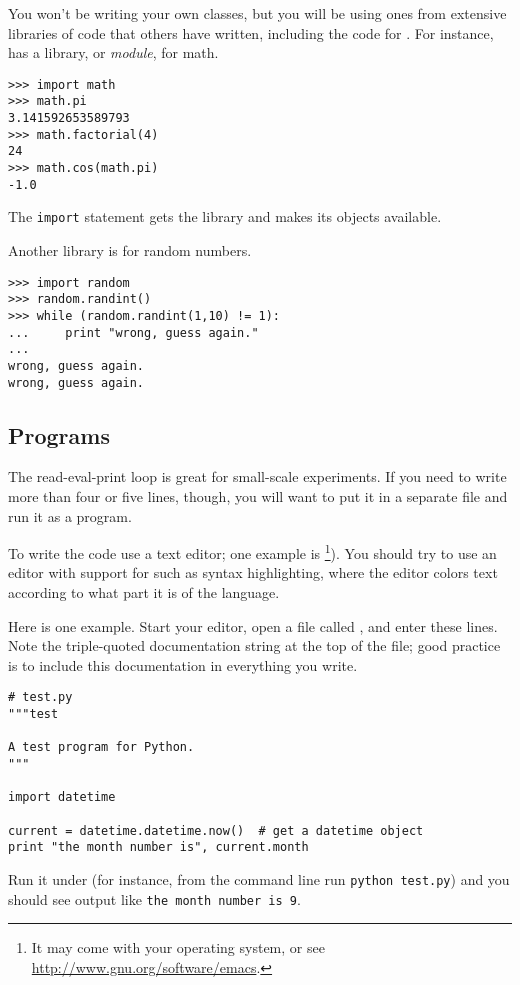 You won't be writing your own classes, but you will be using ones from
extensive libraries of code that others have written, including the
code for \sage. 
For instance, \python{} has a library, or \textit{module}, for math.
\begin{lstlisting}[style=python]
>>> import math
>>> math.pi
3.141592653589793
>>> math.factorial(4)
24
>>> math.cos(math.pi)
-1.0
\end{lstlisting}
The \lstinline[style=inline]!import! statement gets the library and makes
its objects available.

Another library is for random numbers.
\begin{lstlisting}[style=python]
>>> import random
>>> random.randint()
>>> while (random.randint(1,10) != 1):
...     print "wrong, guess again."
... 
wrong, guess again.
wrong, guess again.
\end{lstlisting}



\subsection{Programs}
The read-eval-print loop is great for small-scale experiments.
If you need to write more than four or five lines, though, you will
want to put it in a separate file and run it as a program.

To write the code use a text editor; one example is 
\footnote{It may come with your operating system, or see \protect\url{http://www.gnu.org/software/emacs}.}).
You should try to use an editor with support for \python{} such as 
syntax highlighting, where the editor colors text according to what part
it is of the language.

Here is one example.
Start your editor, open a file called , and enter these lines.
Note the triple-quoted documentation string at the top of the file; 
good practice is to include this documentation in everything you write.
\begin{lstlisting}[style=python]
# test.py
"""test

A test program for Python. 
"""

import datetime
 
current = datetime.datetime.now()  # get a datetime object
print "the month number is", current.month
\end{lstlisting}
Run it under \python{} (for instance, from the command line
run \lstinline[style=inline]!python test.py!) and you should see
output like \lstinline[style=inline]!the month number is 9!.

